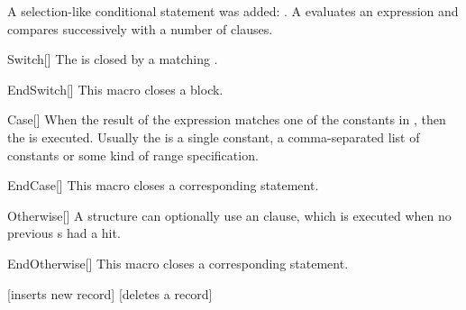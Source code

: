 \documentclass[a4paper, 11pt]{article}
\begin{document}
A selection-like conditional statement was added: . A  evaluates an expression and compares successively with a number of  clauses.

\begin{macro}{Switch}[]
    The  is closed by a matching .

    \BlockOptionsText
\end{macro}

\begin{macro}{EndSwitch}[]
    This macro closes a  block.

    \MacroOptionsText
\end{macro}

\begin{macro}{Case}[]
    When the result of the  expression matches one of the constants in , then the  is executed. Usually the  is a single constant, a comma-separated list of constants or some kind of range specification.

    \BlockOptionsText
\end{macro}

\begin{macro}{EndCase}[]
    This macro closes a corresponding  statement.

    \MacroOptionsText
\end{macro}

\begin{macro}{Otherwise}[]
    A  structure can optionally use an  clause, which is executed when no previous s had a hit.

    \BlockOptionsText
\end{macro}

\begin{macro}{EndOtherwise}[]
    This macro closes a corresponding  statement.

    \MacroOptionsText
\end{macro}

\begin{tcblisting}{}
    \begin{algorithmic}
            [inserts new record]
            \EndCase
            [deletes a record]
            \EndCase
            \Otherwise
            \EndOtherwise
        \EndSwitch
    \end{algorithmic}
\end{tcblisting}
\end{document}
